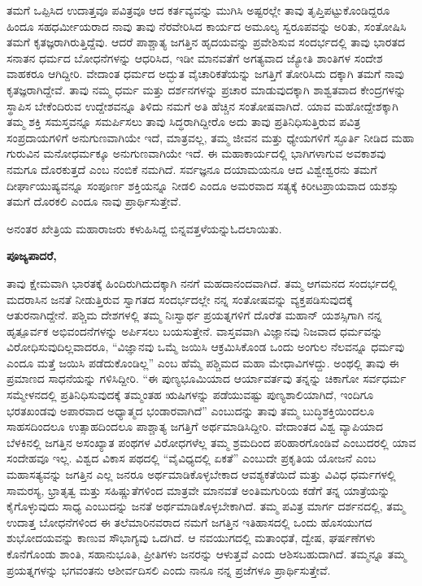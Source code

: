 ತಮಗೆ ಒಪ್ಪಿಸಿದ ಉದಾತ್ತವೂ ಪವಿತ್ರವೂ ಆದ ಕರ್ತವ್ಯವನ್ನು ಮುಗಿಸಿ ಅಷ್ಟರಲ್ಲೇ ತಾವು ತೃಪ್ತಿಪಟ್ಟುಕೊಂಡಿದ್ದರೂ ಹಿಂದೂ ಸಹಧರ್ಮೀಯರಾದ ನಾವು ತಾವು ನೆರವೇರಿಸಿದ ಕಾರ್ಯದ ಅಮೂಲ್ಯ ಸ್ವರೂಪವನ್ನು ಅರಿತು, ಸಂತೋಷಿಸಿ ತಮಗೆ ಕೃತಜ್ಞರಾಗಿರುತ್ತಿದ್ದೆವು. ಆದರೆ ಪಾಶ್ಚಾತ್ಯ ಜಗತ್ತಿನ ಹೃದಯವನ್ನು ಪ್ರವೇಶಿಸುವ ಸಂದರ್ಭದಲ್ಲಿ ತಾವು ಭಾರತದ ಸನಾತನ ಧರ್ಮದ ಬೋಧನೆಗಳನ್ನು ಆಧರಿಸಿದ, ಇಡೀ ಮಾನವತೆಗೆ ಅಗತ್ಯವಾದ ಜ್ಯೋತಿ ಶಾಂತಿಗಳ ಸಂದೇಶ ವಾಹಕರೂ ಆಗಿದ್ದೀರಿ. ವೇದಾಂತ ಧರ್ಮದ ಅದ್ಭುತ ವೈಚಾರಿಕತೆಯನ್ನು ಜಗತ್ತಿಗೆ ತೋರಿಸಿದು ದಕ್ಕಾಗಿ ತಮಗೆ ನಾವು ಕೃತಜ್ಞರಾಗಿದ್ದೇವೆ. ತಾವು ನಮ್ಮ ಧರ್ಮ ಮತ್ತು ದರ್ಶನಗಳನ್ನು ಪ್ರಚಾರ ಮಾಡುವುದಕ್ಕಾಗಿ ಶಾಶ್ವತವಾದ ಕೇಂದ್ರಗಳನ್ನು ಸ್ಥಾಪಿಸ ಬೇಕೆಂದಿರುವ ಉದ್ದೇಶವನ್ನೂ ತಿಳಿದು ನಮಗೆ ಅತಿ ಹೆಚ್ಚಿನ ಸಂತೋಷವಾಗಿದೆ. ಯಾವ ಮಹೋದ್ದೇಶಕ್ಕಾಗಿ ತಮ್ಮ ಶಕ್ತಿ ಸಮಸ್ತವನ್ನೂ ಸಮರ್ಪಿಸಲು ತಾವು ಸಿದ್ಧರಾಗಿದ್ದೀರೊ ಅದು ತಾವು ಪ್ರತಿನಿಧಿಸುತ್ತಿರುವ ಪವಿತ್ರ ಸಂಪ್ರದಾಯಗಳಿಗೆ ಅನುಗುಣವಾಗಿಯೇ ಇದೆ, ಮಾತ್ರವಲ್ಲ, ತಮ್ಮ ಜೀವನ ಮತ್ತು ಧ್ಯೇಯಗಳಿಗೆ ಸ್ಫೂರ್ತಿ ನೀಡಿದ ಮಹಾ ಗುರುವಿನ ಮನೋಧರ್ಮಕ್ಕೂ ಅನುಗುಣವಾಗಿಯೇ ಇದೆ. ಈ ಮಹಾಕಾರ್ಯದಲ್ಲಿ ಭಾಗಿಗಳಾಗುವ ಅವಕಾಶವು ನಮಗೂ ದೊರಕುತ್ತದೆ ಎಂಬ ನಂಬಿಕೆ ನಮಗಿದೆ. ಸರ್ವಜ್ಞನೂ ದಯಾಮಯನೂ ಆದ ವಿಶ್ವೇಶ್ವರನು ತಮಗೆ ದೀರ್ಘಾಯುಷ್ಯವನ್ನೂ ಸಂಪೂರ್ಣ ಶಕ್ತಿಯನ್ನೂ ನೀಡಲಿ ಎಂದೂ ಅಮರವಾದ ಸತ್ಯಕ್ಕೆ ಕಿರೀಟಪ್ರಾಯವಾದ ಯಶಸ್ಸು ತಮಗೆ ದೊರಕಲಿ ಎಂದೂ ನಾವು ಪ್ರಾರ್ಥಿಸುತ್ತೇವೆ.

ಅನಂತರ ಖೇತ್ರಿಯ ಮಹಾರಾಜರು ಕಳುಹಿಸಿದ್ದ ಬಿನ್ನವತ್ತಳೆಯನ್ನು\break ಓದಲಾಯಿತು.

\textbf{ಪೂಜ್ಯಪಾದರೆ,}

ತಾವು ಕ್ಷೇಮವಾಗಿ ಭಾರತಕ್ಕೆ ಹಿಂದಿರುಗಿದುದಕ್ಕಾಗಿ ನನಗೆ ಮಹದಾನಂದವಾಗಿದೆ. ತಮ್ಮ ಆಗಮನದ ಸಂದರ್ಭದಲ್ಲಿ ಮದರಾಸಿನ ಜನತೆ ನೀಡುತ್ತಿರುವ ಸ್ವಾಗತದ ಸಂದರ್ಭದಲ್ಲೇ ನನ್ನ ಸಂತೋಷವನ್ನು ವ್ಯಕ್ತಪಡಿಸುವುದಕ್ಕೆ ಆತುರನಾಗಿದ್ದೇನೆ. ಪಶ್ಚಿಮ ದೇಶಗಳಲ್ಲಿ ತಮ್ಮ ನಿಃಸ್ವಾರ್ಥ ಪ್ರಯತ್ನಗಳಿಗೆ ದೊರೆತ ಮಹಾನ್​ ಯಶಸ್ಸಿಗಾಗಿ ನನ್ನ ಹೃತ್ಪೂರ್ವಕ ಅಭಿವಂದನೆಗಳನ್ನು ಅರ್ಪಿಸಲು ಬಯಸುತ್ತೇನೆ. ವಾಸ್ತವವಾಗಿ ವಿಜ್ಞಾನವು ನಿಜವಾದ ಧರ್ಮವನ್ನು ವಿರೋಧಿಸುವುದಿಲ್ಲವಾದರೂ, “ವಿಜ್ಞಾನವು ಒಮ್ಮೆ ಜಯಿಸಿ ಆಕ್ರಮಿಸಿಕೊಂಡ ಒಂದು ಅಂಗುಲ ನೆಲವನ್ನೂ ಧರ್ಮವು ಎಂದೂ ಮತ್ತೆ ಜಯಿಸಿ ಪಡೆದುಕೊಂಡಿಲ್ಲ” ಎಂಬ ಹೆಮ್ಮೆ ಪಶ್ಚಿಮದ ಮಹಾ ಮೇಧಾವಿಗಳದ್ದು. ಅಂಥಲ್ಲಿ ತಾವು ಈ ಪ್ರಮಾಣದ ಸಾಧನೆಯನ್ನು ಗಳಿಸಿದ್ದೀರಿ. “ಈ ಪುಣ್ಯಭೂಮಿಯಾದ ಆರ್ಯಾವರ್ತವು ತನ್ನನ್ನು ಚಿಕಾಗೋ ಸರ್ವಧರ್ಮ ಸಮ್ಮೇಳನದಲ್ಲಿ ಪ್ರತಿನಿಧಿಸುವುದಕ್ಕೆ ತಮ್ಮಂತಹ ಋಷಿಗಳನ್ನು ಪಡೆಯುವಷ್ಟು ಪುಣ್ಯಶಾಲಿಯಾಗಿದೆ, ಇಂದಿಗೂ ಭರತಖಂಡವು ಅಪಾರವಾದ ಅಧ್ಯಾತ್ಮದ ಭಂಡಾರವಾಗಿದೆ” ಎಂಬುದನ್ನು ತಾವು ತಮ್ಮ ಬುದ್ಧಿಶಕ್ತಿಯಿಂದಲೂ ಸಾಹಸದಿಂದಲೂ ಉತ್ಸಾಹದಿಂದಲೂ ಪಾಶ್ಚಾತ್ಯ ಜಗತ್ತಿಗೆ ಅರ್ಥಮಾಡಿಸಿದ್ದೀರಿ. ವೇದಾಂತದ ವಿಶ್ವ ವ್ಯಾಪಿಯಾದ ಬೆಳಕಿನಲ್ಲಿ ಜಗತ್ತಿನ ಅಸಂಖ್ಯಾತ ಪಂಥಗಳ ವಿರೋಧಗಳೆಲ್ಲ ತಮ್ಮ ಶ್ರಮದಿಂದ ಪರಿಹಾರಗೊಂಡಿವೆ ಎಂಬುದರಲ್ಲಿ ಯಾವ ಸಂದೇಹವೂ ಇಲ್ಲ. ವಿಶ್ವದ ವಿಕಾಸ ಪಥದಲ್ಲಿ “ವೈವಿಧ್ಯದಲ್ಲಿ ಏಕತೆ” ಎಂಬುದೇ ಪ್ರಕೃತಿಯ ಯೋಜನೆ ಎಂಬ ಮಹಾಸತ್ಯವನ್ನು ಜಗತ್ತಿನ ಎಲ್ಲ ಜನರೂ ಅರ್ಥಮಾಡಿಕೊಳ್ಳಬೇಕಾದ ಆವಶ್ಯಕತೆಯಿದೆ ಮತ್ತು ವಿವಿಧ ಧರ್ಮಗಳಲ್ಲಿ ಸಾಮರಸ್ಯ, ಭ್ರಾತೃತ್ವ ಮತ್ತು ಸಹಿಷ್ಣುತೆಗಳಿಂದ ಮಾತ್ರವೇ ಮಾನವತೆ ಅಂತಿಮಗುರಿಯ ಕಡೆಗೆ ತನ್ನ ಯಾತ್ರೆಯನ್ನು ಕೈಗೊಳ್ಳುವುದು ಸಾಧ್ಯ ಎಂಬುದನ್ನು ಜನತೆ ಅರ್ಥಮಾಡಿಕೊಳ್ಳಬೇಕಾಗಿದೆ. ತಮ್ಮ ಪವಿತ್ರ ಮಾರ್ಗ ದರ್ಶನದಲ್ಲಿ, ತಮ್ಮ ಉದಾತ್ತ ಬೋಧನೆಗಳಿಂದ ಈ ತಲೆಮಾರಿನವರಾದ ನಮಗೆ ಜಗತ್ತಿನ ಇತಿಹಾಸದಲ್ಲಿ ಒಂದು ಹೊಸಯುಗದ ಶುಭೋದಯವನ್ನು ಕಾಣುವ ಸೌಭಾಗ್ಯವು ಒದಗಿದೆ. ಆ ನವಯುಗದಲ್ಲಿ ಮತಾಂಧತೆ, ದ್ವೇಷ, ಘರ್ಷಣೆಗಳು ಕೊನೆಗೊಂಡು ಶಾಂತಿ, ಸಹಾನುಭೂತಿ, ಪ್ರೀತಿಗಳು ಜನರನ್ನು ಆಳುತ್ತವೆ ಎಂದು ಆಶಿಸಬಹುದಾಗಿದೆ. ತಮ್ಮನ್ನೂ ತಮ್ಮ ಪ್ರಯತ್ನಗಳನ್ನು ಭಗವಂತನು ಆಶೀರ್ವದಿಸಲಿ ಎಂದು ನಾನೂ ನನ್ನ ಪ್ರಜೆಗಳೂ ಪ್ರಾರ್ಥಿಸುತ್ತೇವೆ.

